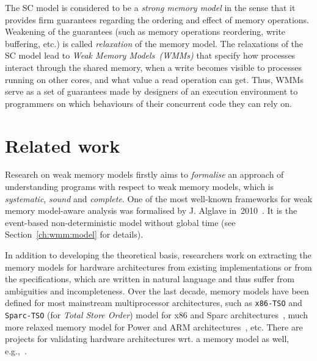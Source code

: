 The SC model is considered to be a \textit{strong memory model} in the sense that it provides firm guarantees regarding the ordering and effect of memory operations.
Weakening of the guarantees (such as memory operations reordering, write buffering, etc.) is called \textit{relaxation} of the memory model.
The relaxations of the SC model lead to \textit{Weak Memory Models~(WMMs)} that specify how processes interact through the shared memory, when a write becomes visible to processes running on other cores, and what value a read operation can get.
Thus, WMMs serve as a set of guarantees made by designers of an execution environment to programmers on which behaviours of their concurrent code they can rely on.


\section{Related work}
\label{ch:intro:related}

Research on weak memory models firstly aims to \textit{formalise} an approach of understanding programs with respect to weak memory models, which is \textit{systematic}, \textit{sound} and \textit{complete}.
One of the most well-known frameworks for weak memory model-aware analysis was formalised by J. Alglave in~2010~\cite{alglave2010shared}.
It is the event-based non-deterministic model without global time (see Section~\ref{ch:wmm:model} for details).

In addition to developing the theoretical basis, researchers work on extracting the memory models for hardware architectures from existing implementations or from the specifications, which are written in natural language and thus suffer from ambiguities and incompleteness.
Over the last decade, memory models have been defined for most mainstream multiprocessor architectures, such as \texttt{x86-TSO} and \texttt{Sparc-TSO} (for \textit{Total Store Order}) model for x86 and Sparc architectures~\cite{owens2009better}, much more relaxed memory model for Power and ARM architectures~\cite{alglave2009semantics,sarkar2011understanding, alglave2014herding}, etc. %
There are projects for validating hardware architectures wrt. a memory model as well, e.g.,~\cite{lustig2014pipecheck,lustig2016coatcheck}.


